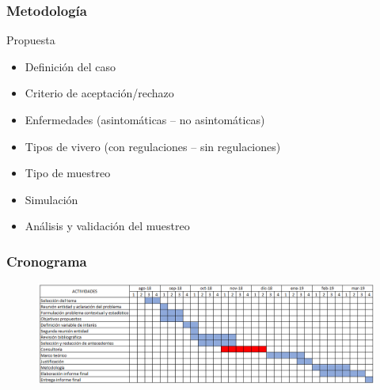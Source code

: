 \documentclass[10.5pt]{beamer}
\begin{document}
\begin{frame}
\frametitle{Metodología}
\begin{block}{Propuesta}
\begin{itemize}
\item Definición del caso
\item Criterio de aceptación/rechazo
\item Enfermedades (asintomáticas – no asintomáticas)
\item Tipos de vivero (con regulaciones – sin regulaciones)
\item Tipo de muestreo
\item Simulación
\item Análisis y validación del muestreo
\end{itemize}
\end{block}
\end{frame}

\begin{frame}
\frametitle{Cronograma}
\begin{figure}[!h]
        \includegraphics[width=12cm]{IMAGENES/Cron.png}
        \label{figura1}
\end{figure}
\end{frame}


  
\end{document}

